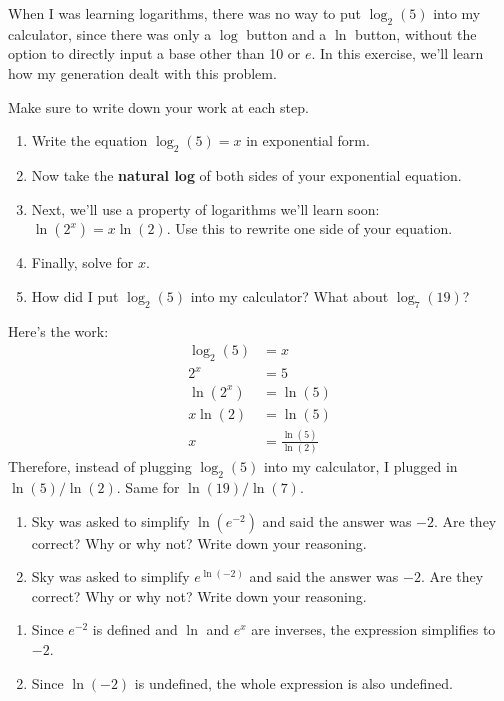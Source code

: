 \documentclass[noauthor]{ximera}
\begin{document}
\begin{problem}
When I was learning logarithms, there was no way to put \(\log_2(5)\)
into my calculator, since there was only a \(\log\) button and a
\(\ln\) button, without the option to directly input a base other
than 10 or \(e\). In this exercise, we'll learn how my generation
dealt with this problem.
 
Make sure to write down your work at each step.
 
\begin{enumerate}
    \item Write the equation \(\log_2(5) = x\) in exponential form.
    \item Now take the \textbf{natural log} of both sides of your
    exponential equation.
    \item Next, we'll use a property of logarithms we'll learn soon:
    \(\ln(2^x) = x \ln(2)\). Use this to rewrite one side of your equation.
    \item Finally, solve for \(x\).
    \item How did I put \(\log_2(5)\) into my calculator? What about
    \(\log_7(19)\)?
\end{enumerate}

\begin{explanation}
    Here's the work:
    \begin{align*}
        \log_2(5) & = x \\
        2^x & = 5 \\
        \ln(2^x) & = \ln(5) \\
        x\ln(2) & = \ln(5) \\
        x & = \frac{\ln(5)}{\ln(2)}
    \end{align*}
    Therefore, instead of plugging \(\log_2(5)\) into my calculator, I plugged in \(\ln(5)/\ln(2)\). Same for \(\ln(19)/\ln(7)\).
\end{explanation}
\end{problem}
 
\begin{problem}
\begin{enumerate}
    \item Sky was asked to simplify \(\ln(e^{-2})\) and said the answer was
    \(-2\). Are they correct? Why or why not? Write down your reasoning.
    \item Sky was asked to simplify \(e^{\ln(-2)}\) and said the answer was
    \(-2\). Are they correct? Why or why not? Write down your reasoning.
\end{enumerate}
\begin{explanation}
    \begin{enumerate}
        \item Since \(e^{-2}\) is defined and \(\ln\) and \(e^x\) are inverses, the expression simplifies to \(-2\).
        \item Since \(\ln(-2)\) is undefined, the whole expression is also undefined.
    \end{enumerate}
\end{explanation}
\end{problem}
 
\end{document}
